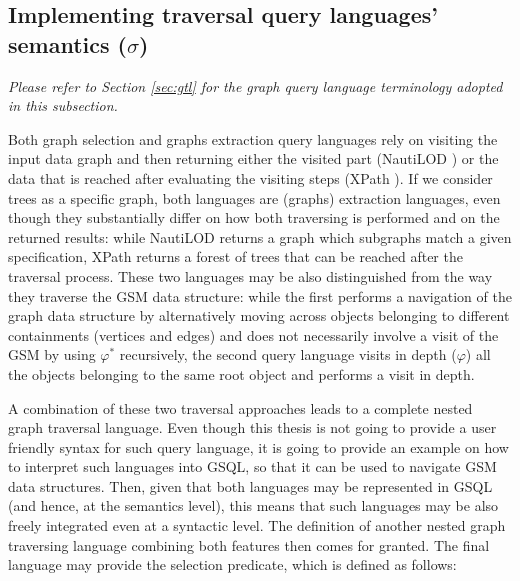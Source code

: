 
\subsection{Implementing traversal query languages' semantics ($\sigma$)}\label{traversalDef}
\textit{Please refer to Section \vref{sec:gtl} for the graph query language terminology adopted in this subsection.}
\bigskip

Both graph selection and graphs extraction query languages rely on visiting the input data graph and then returning either the visited part (NautiLOD \cite{NautiLOD}) or the data that is reached after evaluating the visiting steps (XPath \cite{xpath31}). If we consider trees as a specific  graph, both languages are (graphs) extraction languages, even though they substantially differ on how both traversing is performed and on the returned results: while NautiLOD returns a graph which subgraphs match a given specification, XPath returns a forest of trees that can be reached after the traversal process. These two languages may be also distinguished from the way they traverse the GSM data structure: while the first performs a navigation of the graph data structure by alternatively moving across objects belonging to different containments (vertices and edges) and does not necessarily involve a visit of the GSM by using $\varphi^*$ recursively, the second query language visits in depth ($\varphi$) all the objects belonging to the same root object and performs a visit in depth.

A combination of these two traversal approaches leads to a complete nested graph traversal language. Even though this thesis is not going to provide a user friendly syntax for such query language, it is going to provide an example on how to interpret such languages into GSQL, so that it can be used to navigate GSM data structures. Then, given that both languages may be represented in GSQL (and hence, at the semantics level), this means that such languages may be also freely integrated even at a syntactic level. The definition of another nested graph traversing language combining both features then comes for granted. The final language may provide the selection predicate, which is defined as follows:



